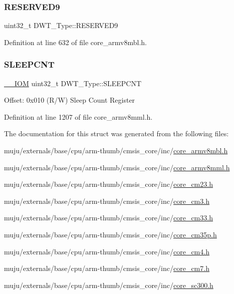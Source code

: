 \subsubsection{\texorpdfstring{R\+E\+S\+E\+R\+V\+E\+D9}{RESERVED9}}
{\footnotesize\ttfamily uint32\+\_\+t D\+W\+T\+\_\+\+Type\+::\+R\+E\+S\+E\+R\+V\+E\+D9}



Definition at line 632 of file core\+\_\+armv8mbl.\+h.

\mbox{\label{struct_d_w_t___type_a416a54e2084ce66e5ca74f152a5ecc70}} 
\subsubsection{\texorpdfstring{S\+L\+E\+E\+P\+C\+NT}{SLEEPCNT}}
{\footnotesize\ttfamily \hyperlink{core__sc300_8h_ab6caba5853a60a17e8e04499b52bf691}{\+\_\+\+\_\+\+I\+OM} uint32\+\_\+t D\+W\+T\+\_\+\+Type\+::\+S\+L\+E\+E\+P\+C\+NT}

Offset\+: 0x010 (R/W) Sleep Count Register 

Definition at line 1207 of file core\+\_\+armv8mml.\+h.



The documentation for this struct was generated from the following files\+:\begin{DoxyCompactItemize}
\item 
muju/externals/base/cpu/arm-\/thumb/cmsis\+\_\+core/inc/\hyperlink{core__armv8mbl_8h}{core\+\_\+armv8mbl.\+h}\item 
muju/externals/base/cpu/arm-\/thumb/cmsis\+\_\+core/inc/\hyperlink{core__armv8mml_8h}{core\+\_\+armv8mml.\+h}\item 
muju/externals/base/cpu/arm-\/thumb/cmsis\+\_\+core/inc/\hyperlink{core__cm23_8h}{core\+\_\+cm23.\+h}\item 
muju/externals/base/cpu/arm-\/thumb/cmsis\+\_\+core/inc/\hyperlink{core__cm3_8h}{core\+\_\+cm3.\+h}\item 
muju/externals/base/cpu/arm-\/thumb/cmsis\+\_\+core/inc/\hyperlink{core__cm33_8h}{core\+\_\+cm33.\+h}\item 
muju/externals/base/cpu/arm-\/thumb/cmsis\+\_\+core/inc/\hyperlink{core__cm35p_8h}{core\+\_\+cm35p.\+h}\item 
muju/externals/base/cpu/arm-\/thumb/cmsis\+\_\+core/inc/\hyperlink{core__cm4_8h}{core\+\_\+cm4.\+h}\item 
muju/externals/base/cpu/arm-\/thumb/cmsis\+\_\+core/inc/\hyperlink{core__cm7_8h}{core\+\_\+cm7.\+h}\item 
muju/externals/base/cpu/arm-\/thumb/cmsis\+\_\+core/inc/\hyperlink{core__sc300_8h}{core\+\_\+sc300.\+h}\end{DoxyCompactItemize}
